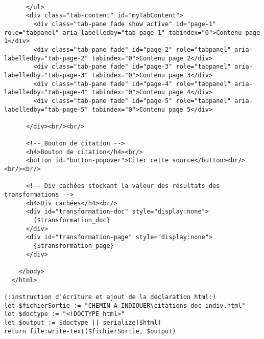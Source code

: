 \begin{verbatim}
        
      </ul>
      <div class="tab-content" id="myTabContent">
        <div class="tab-pane fade show active" id="page-1" role="tabpanel" aria-labelledby="tab-page-1" tabindex="0">Contenu page 1</div>
        <div class="tab-pane fade" id="page-2" role="tabpanel" aria-labelledby="tab-page-2" tabindex="0">Contenu page 2</div>
        <div class="tab-pane fade" id="page-3" role="tabpanel" aria-labelledby="tab-page-3" tabindex="0">Contenu page 3</div>
        <div class="tab-pane fade" id="page-4" role="tabpanel" aria-labelledby="tab-page-4" tabindex="0">Contenu page 4</div>
        <div class="tab-pane fade" id="page-5" role="tabpanel" aria-labelledby="tab-page-5" tabindex="0">Contenu page 5</div>

      </div><br/><br/>
      
      <!-- Bouton de citation -->
      <h4>Bouton de citation</h4><br/>
      <button id="button-popover">Citer cette source</button><br/><br/><br/>
      
      <!-- Div cachées stockant la valeur des résultats des transformations -->
      <h4>Div cachées</h4><br/>
      <div id="transformation-doc" style="display:none">     
        {$transformation_doc} 
      </div>
      <div id="transformation-page" style="display:none">
        {$transformation_page}
      </div>           
            
    </body>
  </html>

(:instruction d'écriture et ajout de la déclaration html:)
let $fichierSortie := "CHEMIN_A_INDIQUER\citations_doc_indiv.html"
let $doctype := "<!DOCTYPE html>"
let $output := $doctype || serialize($html)
return file:write-text($fichierSortie, $output)
\end{verbatim}